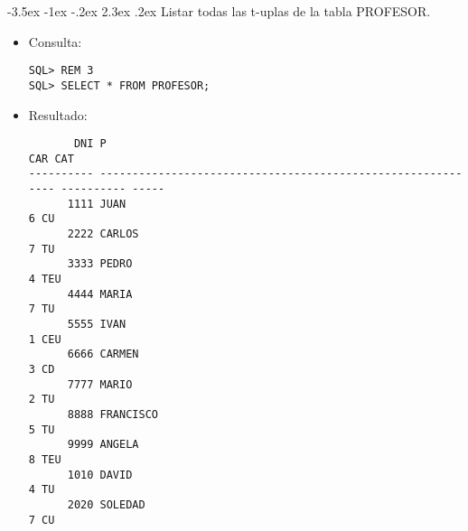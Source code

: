 \documentclass[11pt]{report}
\makeatletter
\renewcommand\chapter{\@startsection{chapter}{0}{\z@}%
    {-3.5ex \@plus -1ex \@minus -.2ex}%
    {2.3ex \@plus.2ex}%
    {\normalfont\Large\bfseries}}
\makeatother
\begin{document}
\chapter{Listar todas las t-uplas de la tabla PROFESOR.}
\begin{itemize}
  \item Consulta:
  \begin{verbatim}
SQL> REM 3
SQL> SELECT * FROM PROFESOR;
  \end{verbatim}
  \item{Resultado:}
  \begin{verbatim}
       DNI P                                                                   CAR CAT                                                                                                                  
---------- ------------------------------------------------------------ ---------- -----                                                                                                                
      1111 JUAN                                                                  6 CU                                                                                                                   
      2222 CARLOS                                                                7 TU                                                                                                                   
      3333 PEDRO                                                                 4 TEU                                                                                                                  
      4444 MARIA                                                                 7 TU                                                                                                                   
      5555 IVAN                                                                  1 CEU                                                                                                                  
      6666 CARMEN                                                                3 CD                                                                                                                   
      7777 MARIO                                                                 2 TU                                                                                                                   
      8888 FRANCISCO                                                             5 TU                                                                                                                   
      9999 ANGELA                                                                8 TEU                                                                                                                  
      1010 DAVID                                                                 4 TU                                                                                                                   
      2020 SOLEDAD                                                               7 CU                                                                                                                   


\end{verbatim}
\end{itemize}
\end{document}
